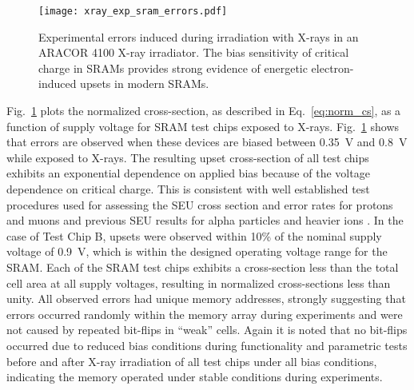 \begin{figure}[tb]
    \centering
        \texttt{[image: xray\_exp\_sram\_errors.pdf]}
    \caption{Experimental errors induced during irradiation with X-rays in an ARACOR 4100 X-ray irradiator. The bias sensitivity of critical charge in SRAMs provides strong evidence of energetic electron-induced upsets in modern SRAMs.}
    \label{fig:xray_exp_seus}
\end{figure}
Fig.~\ref{fig:xray_exp_seus} plots the normalized cross-section, as described in Eq.~\ref{eq:norm_cs}, as a function of supply voltage for SRAM test chips exposed to X-rays.
Fig.~\ref{fig:xray_exp_seus} shows that errors are observed when these devices are biased between 0.35~V and 0.8~V while exposed to X-rays. 
The resulting upset cross-section of all test chips exhibits an exponential dependence on applied bias because of the voltage dependence on critical charge. 
This is consistent with well established test procedures used for assessing the SEU cross section and error rates for protons and muons \cite{Rodbell:2007vl, Sierawski:2010cj} and previous SEU results for alpha particles and heavier ions \cite{buehler1990alpha,barak1999scaling,barak2004use}. 
In the case of Test Chip B, upsets were observed within 10\% of the nominal supply voltage of 0.9~V, which is within the designed operating voltage range for the SRAM. 
Each of the SRAM test chips exhibits a cross-section less than the total cell area at all supply voltages, resulting in normalized cross-sections less than unity.
All observed errors had unique memory addresses, strongly suggesting that errors occurred randomly within the memory array during experiments and were not caused by repeated bit-flips in ``weak'' cells.
Again it is noted that no bit-flips occurred due to reduced bias conditions during functionality and parametric tests before and after X-ray irradiation of all test chips under all bias conditions, indicating the memory operated under stable conditions during experiments.

